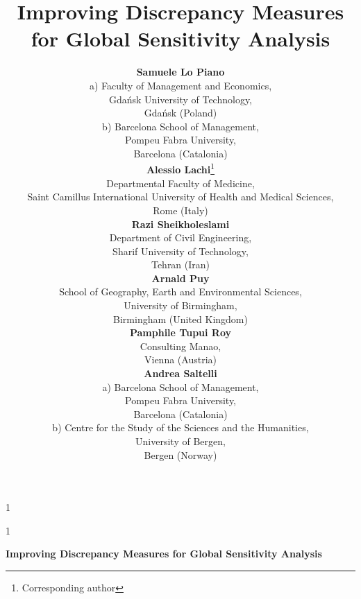 \documentclass[12pt]{article}
\newcommand{\anon}{1}
\begin{document}
\def\spacingset#1{\renewcommand{\baselinestretch}
{#1}\small\normalsize} \spacingset{1}

\anon
{
  \title{\bf Improving Discrepancy Measures for Global Sensitivity Analysis}
  \author{
    \textbf{Samuele Lo Piano} \\
    a) Faculty of Management and Economics,\\ Gdańsk University of Technology,\\ Gdańsk (Poland)\\
    b) Barcelona School of Management,\\ Pompeu Fabra University,\\ Barcelona (Catalonia)\\
    \textbf{Alessio Lachi}\thanks{Corresponding author} \\
    Departmental Faculty of Medicine,\\ Saint Camillus International University of Health and Medical Sciences,\\ Rome (Italy) \\    
    \textbf{Razi Sheikholeslami} \\
    Department of Civil Engineering,\\ Sharif University of Technology,\\ Tehran (Iran)\\
    \textbf{Arnald Puy} \\
    School of Geography, Earth and Environmental Sciences,\\ University of Birmingham,\\ Birmingham (United Kingdom)\\
    \textbf{Pamphile Tupui Roy} \\
    Consulting Manao,\\ Vienna (Austria)\\
    \textbf{Andrea Saltelli} \\
    a) Barcelona School of Management,\\ Pompeu Fabra University,\\ Barcelona (Catalonia)\\
    b) Centre for the Study of the Sciences and the Humanities,\\ University of Bergen,\\ Bergen (Norway)
    }
  \maketitle
} \fi

\anon
{
  \bigskip
  \bigskip
  \bigskip
  \begin{center}
    {\LARGE\bf Improving Discrepancy Measures for Global Sensitivity Analysis}
\end{center}
  \medskip
} \fi
\end{document}
